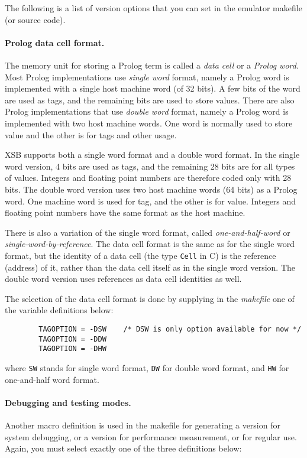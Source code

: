\documentclass[11pt]{article}
\begin{document}
The following is a list of version options that you can set in the
emulator makefile (or source code).

\paragraph{Prolog data cell format. }
The memory unit for storing a Prolog term is called a {\it
data cell} or a {\it Prolog word}. Most Prolog implementations
use {\it single word} format, namely a Prolog word is implemented
with a single host machine word (of 32 bits). A few bits
of the word are used as tags, and the remaining bits are used
to store values. There are also Prolog implementations that use
{\it double word} format, namely a Prolog word is implemented
with two host machine words. One word is normally used to store 
value and the other is for tags and other usage.

XSB supports both a single word format and a double word
format.  In the single word version, 4 bits are used as tags, and the
remaining 28 bits are for all types of values. Integers and
floating point numbers are therefore coded only with 28 bits. The
double word version uses two host machine words (64 bits) as a Prolog
word. One machine word is used for tag, and the other is for value.
Integers and floating point numbers have the same format as the host
machine.

There is also a variation of the single word format, called {\it
one-and-half-word} or {\it single-word-by-reference}. 
The data cell format is the same as for the single word format,
but the identity of a data cell (the type {\tt Cell} in C) is the
reference (address) of it, rather than the data cell itself as in
the single word version. The double word version uses references
as data cell identities as well.

The selection of the data cell format is done by supplying 
in the {\it makefile} one of the variable definitions below:

\begin{verbatim}
        TAGOPTION = -DSW 	/* DSW is only option available for now */
        TAGOPTION = -DDW
        TAGOPTION = -DHW
\end{verbatim}

where {\tt SW} stands for single word format, {\tt DW} for double word
format, and {\tt HW} for one-and-half word format.

\paragraph{Debugging and testing modes. }
Another macro definition is used in the makefile
for generating a version for system debugging, or a version
for performance measurement, or for regular use.
Again, you must select exactly one of the three definitions below:
\end{document}
